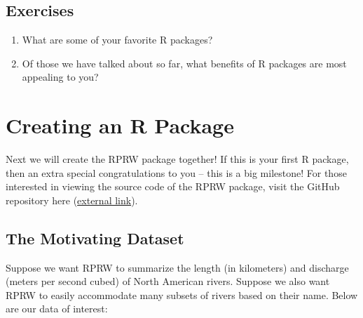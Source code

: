 \documentclass[
]{book}
\begin{document}
\hypertarget{ex-set1}{%
\subsection{Exercises}\label{ex-set1}}

\begin{enumerate}
\def\labelenumi{\arabic{enumi}.}
\item
  What are some of your favorite R packages?
\item
  Of those we have talked about so far, what benefits of R packages are most appealing to you?
\end{enumerate}

\hypertarget{creating-an-r-package}{%
\section{Creating an R Package}\label{creating-an-r-package}}

Next we will create the RPRW package together! If this is your first R package, then an extra special congratulations to you -- this is a big milestone! For those interested in viewing the source code of the RPRW package, visit the GitHub repository here (\href{https://github.com/michaeldumelle/RPRW}{external link}).

\hypertarget{the-motivating-dataset}{%
\subsection{The Motivating Dataset}\label{the-motivating-dataset}}

Suppose we want RPRW to summarize the length (in kilometers) and discharge (meters per second cubed) of North American rivers. Suppose we also want RPRW to easily accommodate many subsets of rivers based on their name. Below are our data of interest:
\end{document}
